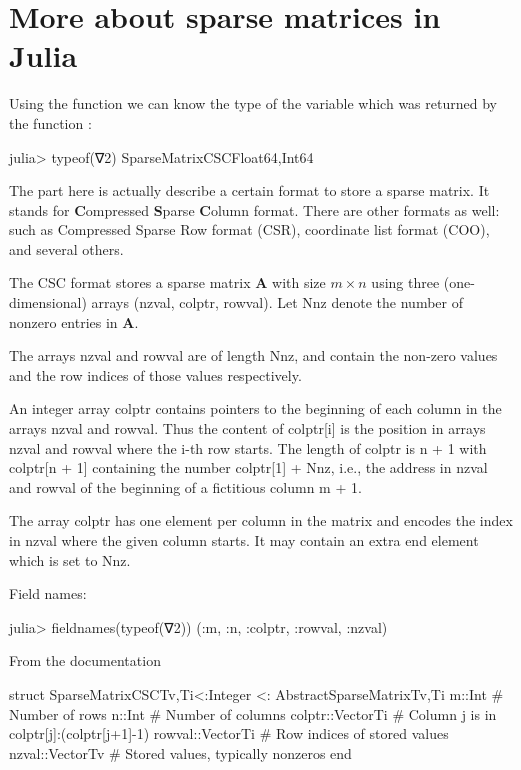 \section{More about sparse matrices in Julia}

Using the function  we can know the type of the variable
 which was returned by the function :
\begin{textcode}
julia> typeof(∇2)
SparseMatrixCSC{Float64,Int64}  
\end{textcode}
The  part here is actually describe a certain format to store
a sparse matrix. It stands for \textbf{C}ompressed \textbf{S}parse \textbf{C}olumn
format. There are other formats as well: such as Compressed Sparse Row format (CSR),
coordinate list format (COO), and several others.

The CSC format stores a sparse matrix $\mathbf{A}$ with size $m \times n$
using three (one-dimensional) arrays (nzval, colptr, rowval).
Let Nnz denote the number of nonzero entries in $\mathbf{A}$.

The arrays nzval and rowval are of length Nnz, and contain the non-zero values
and the row indices of those values respectively.

An integer array colptr contains pointers to the beginning of each column in the
arrays nzval and rowval. Thus the content of colptr[i] is the position in
arrays nzval and rowval where the i-th row starts.
The length of colptr is n + 1 with colptr[n + 1] containing
the number colptr[1] + Nnz, i.e., the address in
nzval and rowval of the beginning of a
fictitious column m + 1.

The array colptr has one element per column in the matrix and encodes
the index in nzval where the given column starts. 
It may contain an extra end element which is set to Nnz.

Field names:
\begin{textcode}
julia> fieldnames(typeof(∇2))
(:m, :n, :colptr, :rowval, :nzval)  
\end{textcode}

From the documentation
\begin{juliacode}
struct SparseMatrixCSC{Tv,Ti<:Integer} <: AbstractSparseMatrix{Tv,Ti}
  m::Int                  # Number of rows
  n::Int                  # Number of columns
  colptr::Vector{Ti}      # Column j is in colptr[j]:(colptr[j+1]-1)
  rowval::Vector{Ti}      # Row indices of stored values
  nzval::Vector{Tv}       # Stored values, typically nonzeros
end
\end{juliacode}


